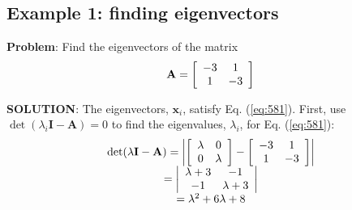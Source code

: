 \subsection*{Example 1: finding eigenvectors} %
\label{ssub:example_1}

\textbf{Problem}: Find the eigenvectors of the matrix
\begin{equation}
	{\bf{A}} = \left[ {\begin{array}{*{20}c}
	   { - 3} & 1  \\
	   1 & { - 3}  \\
	\end{array}} \right]
\end{equation}

\textbf{SOLUTION}: The eigenvectors, $\mathbf{x}_i$, satisfy Eq. (\ref{eq:581}). First, use $\det(\lambda_i\mathbf{I}-\mathbf{A})=0$ to find the eigenvalues, $\lambda_i$, for Eq. (\ref{eq:581}):
\[
\begin{array}{c}
 \det (\lambda {\bf{I}} - {\bf{A}}) = \left| {\left[ {\begin{array}{*{20}c}
   \lambda  & 0  \\
   0 & \lambda   \\
\end{array}} \right] - \left[ {\begin{array}{*{20}c}
   { - 3} & 1  \\
   1 & { - 3}  \\
\end{array}} \right]} \right| \\ 
  = \left| {\begin{array}{*{20}c}
   {\lambda  + 3} & { - 1}  \\
   { - 1} & {\lambda  + 3}  \\
\end{array}} \right| \\ 
  = \lambda ^2  + 6\lambda  + 8 \\ 
 \end{array}
\]

